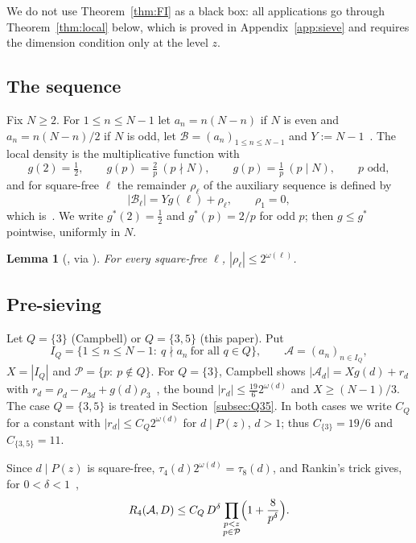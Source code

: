 \documentclass[preprint,11pt]{elsarticle}
\newtheorem{lemma}[theorem]{Lemma}
\theoremstyle{definition}
\theoremstyle{remark}
\newcommand{\cA}{\mathcal{A}}
\newcommand{\cB}{\mathcal{B}}
\newcommand{\cP}{\mathcal{P}}
\numberwithin{equation}{section}
\begin{document}
We do not use Theorem~\ref{thm:FI} as a black box: all applications go
through Theorem~\ref{thm:local} below, which is proved in
Appendix~\ref{app:sieve} and requires the dimension condition only at the
level $z$.

\subsection{The sequence}
Fix $N\ge2$. For $1\le n\le N-1$ let $a_n=n(N-n)$ if $N$ is even and
$a_n=n(N-n)/2$ if $N$ is odd, let $\cB=(a_n)_{1\le n\le N-1}$ and
$Y:=N-1$~\cite[\S3]{Campbell2026}. The local density is the multiplicative
function with
\[
  g(2)=\tfrac12,\qquad g(p)=\tfrac2p\ (p\nmid N),\qquad g(p)=\tfrac1p\ (p\mid N),
  \qquad p \text{ odd},
\]
and for square-free $\ell$ the remainder $\rho_\ell$ of the auxiliary
sequence is defined by
\begin{equation}\label{eq:rho}
  |\cB_\ell| = Yg(\ell)+\rho_\ell ,\qquad \rho_1=0,
\end{equation}
which is~\cite[(3.1)]{Campbell2026}.
We write $g^*(2)=\tfrac12$ and $g^*(p)=2/p$ for odd $p$; then $g\le g^*$
pointwise, uniformly in $N$.

\begin{lemma}[{\cite[proof of Lemma~4.3]{Campbell2026}, via \cite[Theorem~7.2]{Nathanson1996}}]\label{lem:rho}
For every square-free $\ell$, $|\rho_\ell|\le 2^{\omega(\ell)}$.
\end{lemma}

\subsection{Pre-sieving}
Let $Q=\{3\}$ (Campbell) or $Q=\{3,5\}$ (this paper). Put
\[
  I_Q=\{1\le n\le N-1:\ q\nmid a_n\ \text{for all } q\in Q\},\qquad
  \cA=(a_n)_{n\in I_Q},
\]
$X=|I_Q|$ and $\cP=\{p:\ p\notin Q\}$.
For $Q=\{3\}$, Campbell shows $|\cA_d|=Xg(d)+r_d$ with
$r_d=\rho_d-\rho_{3d}+g(d)\rho_3$~\cite[(3.3)]{Campbell2026}, the bound
$|r_d|\le\frac{19}{6}2^{\omega(d)}$ and $X\ge(N-1)/3$. The case
$Q=\{3,5\}$ is treated in Section~\ref{subsec:Q35}. In both cases we write
$C_Q$ for a constant with $|r_d|\le C_Q2^{\omega(d)}$ for $d\mid P(z)$,
$d>1$; thus $C_{\{3\}}=19/6$ and $C_{\{3,5\}}=11$.

Since $d\mid P(z)$ is square-free, $\tau_4(d)2^{\omega(d)}=\tau_8(d)$, and
Rankin's trick gives, for $0<\delta<1$~\cite[(4.4)]{Campbell2026},
\begin{equation}\label{eq:rankin}
  R_4(\cA,D)\le C_Q\,D^{\delta}\prod_{\substack{p<z\\ p\in\cP}}\Bigl(1+\frac{8}{p^{\delta}}\Bigr).
\end{equation}
\end{document}
